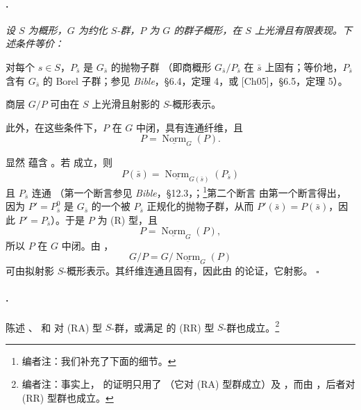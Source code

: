 \paragraph{.}
{\itshape 设 \(S\) 为概形，\(G\) 为约化 \(S\)-群，\(P\) 为 \(G\) 的群子概形，在 \(S\) 上光滑且有限表现。下述条件等价：

\textup{} 对每个 \(s\in S\)，\(P_{\bar s}\) 是 \(G_{\bar s}\) 的抛物子群 \textup{（即商概形 \(G_{\bar s}/P_{\bar s}\) 在 \(\bar s\) 上固有；等价地，\(P_{\bar s}\) 含有 \(G_{\bar s}\) 的 Borel 子群；参见 \emph{Bible}，\S6.4，定理 4，或 [Ch05]，\S6.5，定理 5）}。

\textup{} 商层 \(G/P\) 可由在 \(S\) 上光滑且射影的 \(S\)-概形表示。

此外，在这些条件下，\(P\) 在 \(G\) 中闭，具有连通纤维，且
\[
  P=\underline{\operatorname{Norm}}_G(P).
\]}

显然 \textup{} 蕴含 \textup{}。若 \textup{} 成立，则
\[
  P(\bar s)
  =
  \underline{\operatorname{Norm}}_{G(\bar s)}(P_{\bar s})
\]
且 \(P_{\bar s}\) 连通 \textup{（第一个断言参见 \emph{Bible}，\S12.3，；\footnote{编者注：我们补充了下面的细节。}第二个断言}
\textup{由第一个断言得出，因为 \(P'=P_{\bar s}^{0}\) 是 \(G_{\bar s}\) 的一个被 \(P_{\bar s}\) 正规化的抛物子群，从而 \(P'(\bar s)=P(\bar s)\)，因此 \(P'=P_{\bar s}\)）}。于是 \(P\) 为 \textup{(R)} 型，且
\[
  P=\underline{\operatorname{Norm}}_G(P),
\]
所以 \(P\) 在 \(G\) 中闭。由 ，
\[
  G/P=G/\underline{\operatorname{Norm}}_G(P)
\]
可由拟射影 \(S\)-概形表示。其纤维连通且固有，因此由  的论证，它射影。
\hfill\(\square\)

\paragraph{.}
陈述 、 和  对 \textup{(RA)} 型 \(S\)-群，或满足  的 \textup{(RR)} 型 \(S\)-群也成立。\footnote{编者注：事实上， 的证明只用了  \textup{（它对 \textup{(RA)} 型群成立）}及 ，而由 ，后者对 \textup{(RR)} 型群也成立。}

